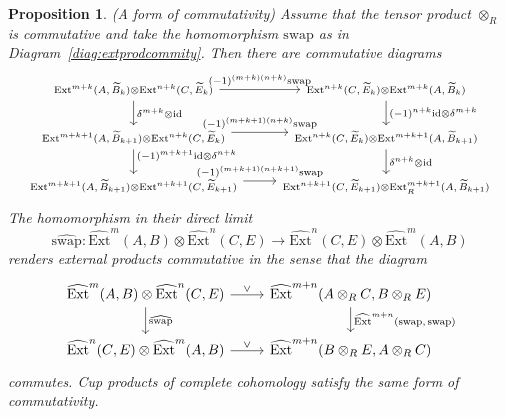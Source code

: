 \documentclass[10pt,a4paper]{amsart}
\newtheorem{prop}{Proposition}
\begin{document}
\begin{prop}\label{prop:extprodsgradedcomm}
(A form of commutativity)\newline
Assume that the tensor product $\otimes_R$ is commutative and take the homomorphism $\mathrm{swap}$ as in Diagram~\ref{diag:extprodcommity}. Then there are commutative diagrams
\begin{equation}\label{diag:swapdirlim}
\begin{tikzcd}
    {\scriptstyle \mathrm{Ext}^{m+k}(A{,} \, \widetilde{B}_k) \otimes \mathrm{Ext}^{n+k}(C{,} \, \widetilde{E}_k)} \arrow[r, "{\scriptstyle (-1)^{(m+k)(n+k)} \mathrm{swap}}"] \arrow[d, "{\scriptstyle \delta^{m+k} \otimes \mathrm{id}}"] & {\scriptstyle \mathrm{Ext}^{n+k}(C{,} \, \widetilde{E}_k) \otimes \mathrm{Ext}^{m+k}(A{,} \, \widetilde{B}_k)} \arrow[d, "{\scriptstyle (-1)^{n+k} \mathrm{id} \otimes \delta^{m+k}}"] \\
    {\scriptstyle \mathrm{Ext}^{m+k+1}(A{,} \, \widetilde{B}_{k+1}) \otimes \mathrm{Ext}^{n+k}(C{,} \, \widetilde{E}_k)} \arrow[r, shift left = 4pt, "{\scriptstyle (-1)^{(m+k+1)(n+k)} \mathrm{swap}}"] \arrow[d, "{\scriptstyle (-1)^{m+k+1} \mathrm{id} \otimes \delta^{n+k}}" near start] & {\scriptstyle \mathrm{Ext}^{n+k}(C{,} \, \widetilde{E}_k) \otimes \mathrm{Ext}^{m+k+1}(A{,} \, \widetilde{B}_{k+1})} \arrow[d, "{\scriptstyle \delta^{n+k} \otimes \mathrm{id}}"] \\
    {\scriptstyle \mathrm{Ext}^{m+k+1}(A{,} \, \widetilde{B}_{k+1}) \otimes \mathrm{Ext}^{n+k+1}(C{,} \, \widetilde{E}_{k+1})} \arrow[r, shift left = 4pt, "{\scriptstyle (-1)^{(m+k+1)(n+k+1)} \mathrm{swap}}"] & {\scriptstyle \mathrm{Ext}^{n+k+1}(C{,} \, \widetilde{E}_{k+1}) \otimes \mathrm{Ext}_R^{m+k+1}(A{,} \, \widetilde{B}_{k+1})}
\end{tikzcd}
\end{equation}
The homomorphism in their direct limit
\[ \widehat{\mathrm{swap}}: \widehat{\mathrm{Ext}}^m(A, B) \otimes \widehat{\mathrm{Ext}}^n(C, E) \rightarrow \widehat{\mathrm{Ext}}^n(C, E) \otimes \widehat{\mathrm{Ext}}^m(A, B) \]
renders external products commutative in the sense that the diagram
\begin{equation}\label{diag:fakecommity}
\begin{tikzcd}
    \widehat{\mathrm{Ext}}^m(A{,} \, B) \otimes \widehat{\mathrm{Ext}}^n(C{,} \, E) \arrow[r, "\vee"] \arrow[d, "\widehat{\mathrm{swap}}"] & \widehat{\mathrm{Ext}}^{m+n}(A \otimes_R C{,} \, B \otimes_R E) \arrow[d, "\widehat{\mathrm{Ext}}^{m+n}(\mathrm{swap}{,} \, \mathrm{swap})"] \\
    \widehat{\mathrm{Ext}}^n(C{,} \, E) \otimes \widehat{\mathrm{Ext}}^m(A{,} \, B) \arrow[r, "\vee"] & \widehat{\mathrm{Ext}}^{m+n}(B \otimes_R E{,} \, A \otimes_R C)
\end{tikzcd}
\end{equation}
commutes. Cup products of complete cohomology satisfy the same form of commutativity.
\end{prop}
\end{document}
